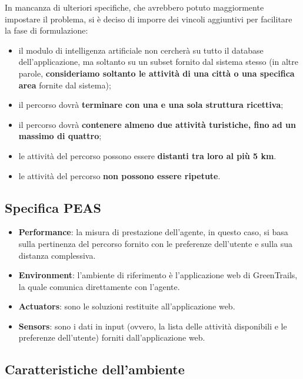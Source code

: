 \documentclass{CSUniSchoolLabReport}
\begin{document}
In mancanza di ulteriori specifiche, che avrebbero potuto maggiormente impostare il problema, si è deciso di imporre dei vincoli aggiuntivi per facilitare la fase di formulazione:
\begin{itemize}
	\item il modulo di intelligenza artificiale non cercherà su tutto il database dell'applicazione, ma soltanto su un subset fornito dal sistema stesso (in altre parole, \textbf{consideriamo soltanto le attività di una città o una specifica area} fornite dal sistema);
	\item il percorso dovrà \textbf{terminare con una e una sola struttura ricettiva};
	\item il percorso dovrà \textbf{contenere almeno due attività turistiche, fino ad un massimo di quattro};
	\item le attività del percorso possono essere \textbf{distanti tra loro al più 5 km}.
    \item le attività del percorso \textbf{non possono essere ripetute}.
\end{itemize}

\pagebreak

\subsection{Specifica PEAS}

\begin{itemize}
 \item \textbf{Performance}: la misura di prestazione dell'agente, in questo caso, si basa sulla pertinenza del percorso fornito con le preferenze dell'utente e sulla sua distanza complessiva.
 \item \textbf{Environment}: l'ambiente di riferimento è l'applicazione web di GreenTrails, la quale comunica direttamente con l'agente.
 \item \textbf{Actuators}: sono le soluzioni restituite all'applicazione web.
 \item \textbf{Sensors}: sono i dati in input (ovvero, la lista delle attività disponibili e le preferenze dell'utente) forniti dall'applicazione web.
\end{itemize}


\subsection{Caratteristiche dell'ambiente}
\end{document}
